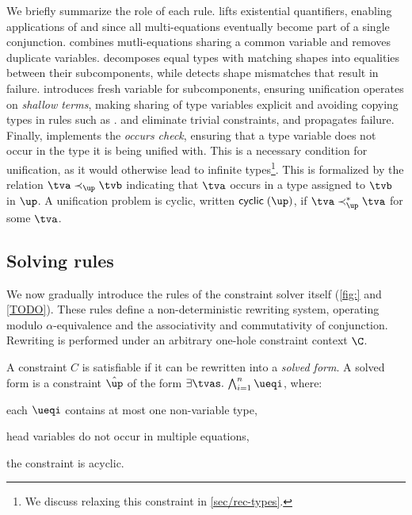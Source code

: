 \documentclass[acmsmall,screen,nonacm,review]{acmart}
\begin{document}
We briefly summarize the role of each rule.  lifts existential
quantifiers, enabling applications of  and  since
all multi-equations eventually become part of a single conjunction.
 combines mutli-equations sharing a common variable and
 removes duplicate variables.  decomposes equal
types with matching shapes into equalities between their subcomponents, while
 detects shape mismatches that result in failure. 
introduces fresh variable for subcomponents, ensuring unification operates on
\emph{shallow terms}, making sharing of type variables explicit and avoiding
copying types in rules such as .  and
 eliminate trivial constraints, and  propagates
failure.
%
Finally,  implements the \emph{occurs check}, ensuring that a
type variable does not occur in the type it is being unified with. This is a
necessary condition for unification, as it would otherwise lead to infinite
types\footnote{We discuss relaxing this constraint in \cref{sec/rec-types}.}.
This is formalized by the relation $\tv \prec_\up \tvb$ indicating that $\tv$
occurs in a type assigned to $\tvb$ in $\up$. A unification problem is cyclic,
written $\cyclic \up$, if $\tv \prec_\up^* \tv$ for some $\tv$.

\subsection{Solving rules}


We now gradually introduce the rules of the constraint solver itself (\cref{fig:}
and \cref{TODO}).
These rules define a non-deterministic rewriting
system, operating modulo $\alpha$-equivalence and the associativity and
commutativity of conjunction. Rewriting is performed under an arbitrary
one-hole constraint context $\C$.

A constraint $C$ is satisfiable if it can be rewritten into a \emph{solved
form}. A solved form is a constraint $\hat\up$ of the form $\cexists \tvs \cAnd
\iton \ueqi$, where:
\begin{enumerate*}
  \item each $\ueqi$ contains at most one non-variable type,
  \item head variables do not occur in multiple equations,
  \item the constraint is acyclic.
\end{enumerate*}
\end{document}
